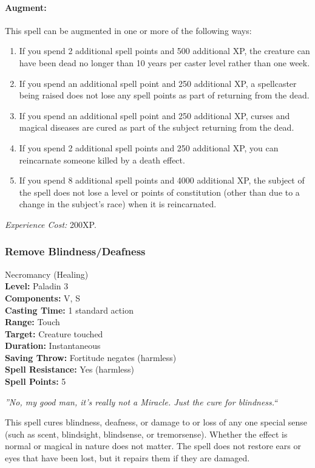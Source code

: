 \paragraph{Augment:} This spell can be augmented in one or more of the following ways:
\begin{enumerate}
 \item If you spend 2 additional spell points and 500 additional XP, 
the creature can have been dead no longer than 10 years per caster level rather than one week.
 \item If you spend an additional spell point and 250 additional XP, a spellcaster being raised does not
lose any spell points as part of returning from the dead.
 \item If you spend an additional spell point and 250 additional XP, 
curses and magical diseases are cured as part of the subject returning from the dead.
 \item If you spend 2 additional spell points and 250 additional XP, 
you can reincarnate someone killed by a death effect.
 \item If you spend 8 additional spell points and 4000 additional XP,
the subject of the spell does not lose a level or points of constitution (other than due to a change in the subject's race) when it is reincarnated.
\end{enumerate}

\emph{Experience Cost:} 200XP.
\subsubsection{Remove Blindness/Deafness}
\label{Spell:RemoveBlindnessDeafness}
Necromancy (Healing)
\\ \textbf{Level:} Paladin 3
\\ \textbf{Components:} V, S
\\ \textbf{Casting Time:} 1 standard action
\\ \textbf{Range:} Touch
\\ \textbf{Target:} Creature touched
\\ \textbf{Duration:} Instantaneous
\\ \textbf{Saving Throw:} Fortitude negates (harmless)
\\ \textbf{Spell Resistance:} Yes (harmless)
\\ \textbf{Spell Points:} 5

\emph{''No, my good man, it's really not a Miracle. Just the cure for blindness.``}

This spell cures blindness, deafness, or damage to or loss of any one special sense (such as scent, blindsight, blindsense, or tremorsense). 
Whether the effect is normal or magical in nature does not matter.
The spell does not restore ears or eyes that have been lost, but it repairs them if they are damaged.
